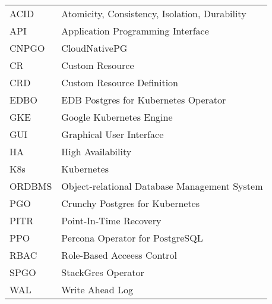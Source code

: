 
\seznamzkr

\begin{tabular}{ll}
  ACID   & Atomicity, Consistency, Isolation, Durability \\
  API    & Application Programming Interface             \\
  CNPGO  & CloudNativePG                                 \\
  CR     & Custom Resource                               \\
  CRD    & Custom Resource Definition                    \\
  EDBO   & EDB Postgres for Kubernetes Operator          \\
  GKE    & Google Kubernetes Engine                      \\
  GUI    & Graphical User Interface                      \\
  HA     & High Availability                             \\
  K8s    & Kubernetes                                    \\
  ORDBMS & Object-relational Database Management System  \\
  PGO    & Crunchy Postgres for Kubernetes               \\
  PITR   & Point-In-Time Recovery                        \\
  PPO    & Percona Operator for PostgreSQL               \\
  RBAC   & Role-Based Acceess Control                    \\
  SPGO   & StackGres Operator                            \\
  WAL    & Write Ahead Log                               \\
\end{tabular}


